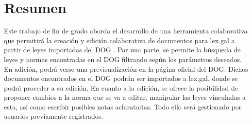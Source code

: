 \pagestyle{plain}
\chapter*{Resumen}
Este trabajo de fin de grado aborda el desarrollo de una herramienta colaborativa que permitirá la creación y edición colaborativa de documentos para lex.gal \cite{lexgal} a partir de leyes importadas del DOG \cite{dog}. Por una parte, se permite la búsqueda de leyes y normas encontradas en el DOG filtrando según los parámetros deseados. En adición, podrá verse una previsualización en la página oficial del DOG. Dichos documentos encontrados en el DOG podrán ser importados a lex.gal, donde se podrá proceder a su edición. En cuanto a la edición, se ofrece la posibilidad de proponer cambios a la norma que se va a editar, manipular las leyes vinculadas a esta, así como escribir posibles notas aclaratorias. Todo ello será gestionado por usuarios previamente registrados.